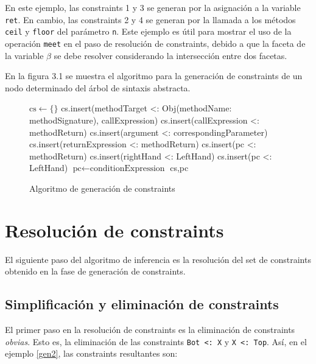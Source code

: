 En este ejemplo, las constraints 1 y 3 se generan por la asignación a la variable \texttt{ret}. En cambio, las constraints 2 y 4 se generan por la llamada a los métodos \texttt{ceil} y \texttt{floor} del parámetro \texttt{n}. Este ejemplo es útil para mostrar el uso de la operación \texttt{meet} en el paso de resolución de constraints, debido a que la faceta de la variable $\beta$ se debe resolver considerando la intersección entre dos facetas.

En la figura 3.1 se muestra el algoritmo para la generación de constraints de un nodo determinado del árbol de sintaxis abstracta.

\begin{figure}[ht]
  \centering
  \label{pseudogen}
  \begin{mdframed}
    \begin{algorithmic}
          \State $\text{cs}\gets \{\}$
            \State cs.insert(methodTarget <: Obj(methodName: methodSignature), callExpression)
            \State cs.insert(callExpression <: methodReturn)
              \State cs.insert(argument <: correspondingParameter)
            \EndFor
            \State cs.insert(returnExpression <: methodReturn)
            \State cs.insert(pc <: methodReturn)
            \State cs.insert(rightHand <: LeftHand)
            \State cs.insert(pc <: LeftHand)
            \State $\text{pc}\gets \text{conditionExpression}$
          \EndIf
          \State \Return cs,pc
      \EndFunction
    \end{algorithmic}
  \end{mdframed}
  \caption{Algoritmo de generación de constraints}
\end{figure}

\section{Resolución de constraints}

El siguiente paso del algoritmo de inferencia es la resolución del set de constraints obtenido en la fase de generación de constraints.

\subsection{Simplificación y eliminación de constraints}
El primer paso en la resolución de constraints es la eliminación de constraints \textit{obvias}. Esto es, la eliminación de las constraints \texttt{Bot <: X} y \texttt{X <: Top}. Así, en el ejemplo \ref{gen2}, las constraints resultantes son:

